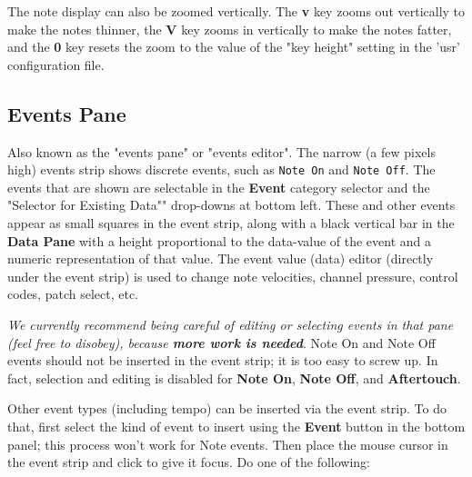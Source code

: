    The note display can also be zoomed vertically.
   The \textbf{v} key zooms out vertically to make the notes thinner,
   the \textbf{V} key zooms in vertically to make the notes fatter,
   and the \textbf{0} key resets the zoom to the value of the "key height"
   setting in the 'usr' configuration file.
   
\subsection{Events Pane}
\label{subsec:pattern_editor_panel}

   Also known as the "events pane" or "events editor".
   The narrow (a few pixels high) events strip shows discrete events,
   such as \texttt{Note On} and \texttt{Note Off}.
   The events that are shown are selectable in the \textbf{Event} category
   selector and the "Selector for Existing Data"" drop-downs at bottom left.
   These and other events appear
   as small squares in the event strip, along with a black vertical bar
   in the \textbf{Data Pane} with a
   height proportional to the data-value of the event and a numeric
   representation of that value.
	The event value (data) editor (directly under the event strip) is used 
	to change note velocities, channel pressure, control codes,
	patch select, etc.

   \textsl{We currently recommend being careful of editing or selecting events
   in that pane (feel free to disobey), because
   \textbf{more work is needed}}.
   Note On and Note Off events should not be inserted in the event strip;
   it is too easy to
   screw up.  In fact, selection and editing is disabled for
   \textbf{Note On}, \textbf{Note Off}, and \textbf{Aftertouch}.

   Other event types (including tempo) can be inserted via the event strip.
   To do that, first select the kind of event to insert using the
   \textbf{Event} button in the bottom panel; this process won't work
   for Note events.
   Then place the mouse cursor in the event strip and click to give it
   focus.
   Do one of the following:

